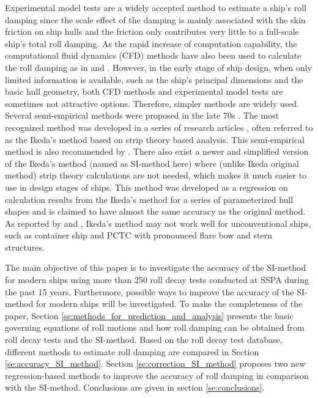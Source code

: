 Experimental model tests are a widely accepted method to estimate a ship's roll damping since the scale effect of the damping is mainly associated with the skin friction on ship hulls and the friction only contributes very little to a full-scale ship's total roll damping\parencite{imo_1200_2006}. As the rapid increase of computation capability, the computational fluid dynamics (CFD) methods have also been used to calculate the roll damping as in \parencite{kristiansen_experimental_2014} and \parencite{henry_peter_piehl_ship_2016}.  
However, in the early stage of ship design, when only limited information is available, such as the ship's principal dimensions and the basic hull geometry, both CFD methods and experimental model tests are sometimes not attractive options. Therefore, simpler methods are widely used. 
Several semi-empirical methods were proposed in the late 70s \parencite{himeno_prediction_1981}. The most recognized method was developed in a series of research articles \parencite{ikeda_roll_1978,ikeda_eddy_1978,ikeda_roll_1979,ikeda_components_1978,ikeda_velocity_1979}, often referred to as the Ikeda's method based on strip theory based analysis. This semi-empirical method is also recommended by \parencite{ittc_ittc_2011}. 
There also exist a newer and simplified version of the Ikeda's method \parencite{kawahara_simple_2011} (named as SI-method here) where (unlike Ikeda original method) strip theory calculations are not needed, which makes it much easier to use in design stages of ships. This method was developed as a regression on calculation results from the Ikeda's method for a series of parameterized hull shapes and is claimed to have almost the same accuracy as the original method. As reported by  \parencite{kawahara_simple_2011} and \parencite{soder_ikeda_2019}, Ikeda's method may not work well for unconventional ships, such as container ship and PCTC with pronounced flare bow and stern structures. 

The main objective of this paper is to investigate the accuracy of the SI-method for modern ships using more than 250 roll decay tests conducted at SSPA during the past 15 years. Furthermore, possible ways to improve the accuracy of the SI-method for modern ships will be investigated.
To make the completeness of the paper, Section \ref{se:methods_for_prediction_and_analysis} presents the basic governing equations of roll motions and how roll damping can be obtained from roll decay tests and the SI-method. 
Based on the roll decay test database, different methods to estimate roll damping are compared in Section \ref{se:accuracy_SI_method}. Section \ref{se:correction_SI_method} proposes two new regression-based methods to improve the accuracy of roll damping in comparison with the SI-method. Conclusions are given in section \ref{se:conclusions}.  
